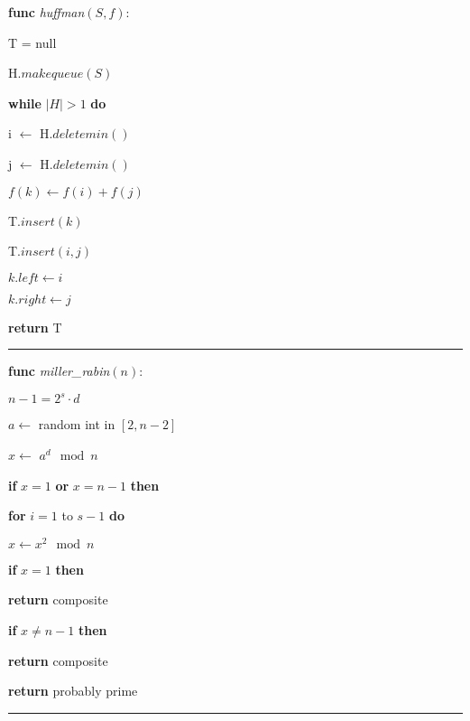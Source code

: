 \documentclass[10pt]{article}
\begin{document}
\newpage

\textbf{func} \emph{huffman}$(S,f)$:
\par
\hspace{10pt} T = null
\par
\hspace{10pt} H.$makequeue(S)$
\par
\hspace{10pt} \textbf{while} $|H|>1$ \textbf{do}
\par
\hspace{20pt} i $\gets$ H.$deletemin()$
\par
\hspace{20pt} j $\gets$ H.$deletemin()$
\par
\hspace{20pt} $f(k) \gets f(i)+f(j)$
\par
\hspace{20pt} T.$insert(k)$
\par
\hspace{20pt} T.$insert(i,j)$
\par
\hspace{20pt} $k.left \gets i$
\par
\hspace{20pt} $k.right \gets j$
\par
\hspace{10pt} \textbf{return} T
\vspace{.125cm}
\hrule

\vspace{2.25cm}
\textbf{func} \emph{miller\_rabin}$(n)$:
\par
\hspace{10pt} $n-1 = 2^s \cdot d$
\par
\hspace{10pt} $a \gets$ random int in $[2,n-2]$
\par
\hspace{10pt} $x \gets$ $a^d \mod n$
\par
\hspace{10pt} \textbf{if} $x=1$ \textbf{or} $x=n-1$ \textbf{then}
\par
\hspace{20pt} \textbf{for} $i=1$ to $s-1$ \textbf{do}
\par
\hspace{30pt} $x \gets x^2 \mod n$
\par
\hspace{30pt} \textbf{if} $x=1$ \textbf{then}
\par
\hspace{40pt} \textbf{return} composite
\par
\hspace{20pt} \textbf{if} $x \neq n-1$ \textbf{then}
\par
\hspace{40pt} \textbf{return} composite
\par
\hspace{10pt} \textbf{return} probably prime
\vspace{.125cm}
\hrule
\end{document}
